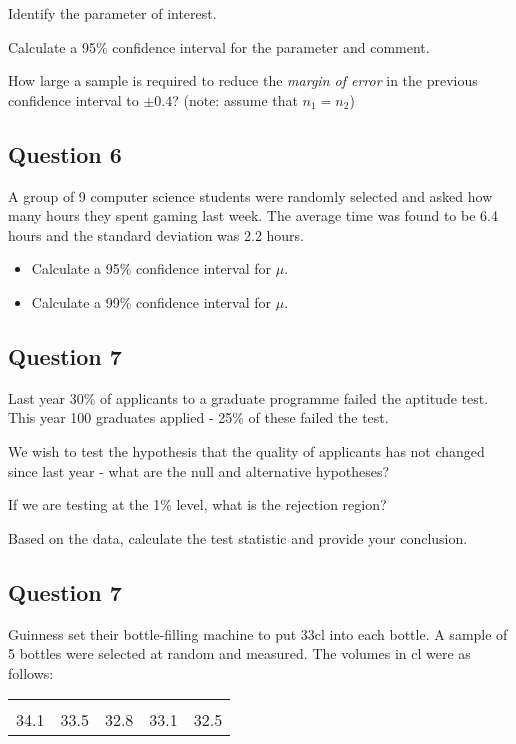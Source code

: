 \item  Identify the parameter of interest. 
\item  Calculate a 95\% confidence interval for the parameter and comment. 
\item  How large a sample is required to reduce the \emph{margin of error} in the previous confidence interval to $\pm 0.4$? (note: assume that $n_1 = n_2$)




\subsection*{Question 6}
A group of 9 computer science students were randomly selected and asked how many hours they spent gaming last week. The average time was found to be 6.4 hours and the standard deviation was 2.2 hours.
\begin{itemize}
\item[\item ] Calculate a 95\% confidence interval for $\mu$. \item[\item] Calculate a 99\% confidence interval for $\mu$.
\end{itemize}






\subsection*{Question 7}
Last year 30\% of applicants to a graduate programme failed the aptitude test. This year 100 graduates applied - 25\% of these failed the test.\\[-0.2cm]

\item  We wish to test the hypothesis that the quality of applicants has not changed since last year - what are the null and alternative hypotheses? 
\item  If we are testing at the 1\% level, what is the rejection region? 
\item  Based on the data, calculate the test statistic and provide your conclusion.





\subsection*{Question 7}
Guinness set their bottle-filling machine to put 33cl into each bottle. A sample of 5 bottles were selected at random and measured. The volumes in cl were as follows:\\[-0.2cm]
\begin{center}
\begin{tabular}{|ccccc|}
\hline
&&&&\\[-0.3cm]
34.1  & 33.5 & 32.8 & 33.1 & 32.5\\[0.1cm]
\hline
\end{tabular}
\end{center}


